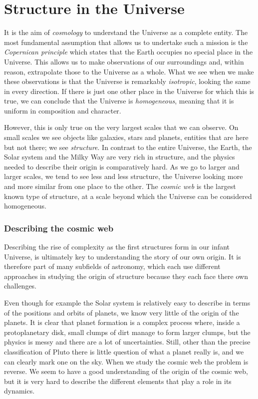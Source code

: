 \clearpage
\section{Structure in the Universe}
It is the aim of \emph{cosmology} to understand the Universe as a complete entity.  The most fundamental assumption that allows us to undertake such a mission is the \emph{Copernican principle} which states that the Earth occupies no special place in the Universe. This allows us to make observations of our surroundings and, within reason, extrapolate those to the Universe as a whole.
What we see when we make these observations is that the Universe is remarkably \emph{isotropic}, looking the same in every direction. If there is just one other place in the Universe for which this is true, we can conclude that the Universe is \emph{homogeneous}, meaning that it is uniform in composition and character.

However, this is only true on the very largest scales that we can observe. On small scales we see objects like galaxies, stars and planets, entities that are here but not there; we see \emph{structure}. In contrast to the entire Universe, the Earth, the Solar system and the Milky Way are very rich in structure, and the physics needed to describe their origin is comparatively hard. As we go to larger and larger scales, we tend to see less and less structure, the Universe looking more and more similar from one place to the other.  The \emph{cosmic web} is the largest known type of structure, at a scale beyond which the Universe can be considered homogeneous.

\subsubsection{Describing the cosmic web}
Describing the rise of complexity as the first structures form in our infant Universe, is ultimately key to understanding the story of our own origin. It is therefore part of many subfields of astronomy, which each use different approaches in studying the origin of structure because they each face there own challenges.

Even though for example the Solar system is relatively easy to describe in terms of the positions and orbits of planets, we know very little of the origin of the planets. It is clear that planet formation is a complex process where, inside a protoplanetary disk, small clumps of dirt manage to form larger clumps, but the physics is messy and there are a lot of uncertainties. Still, other than the precise classification of Pluto there is little question of what a planet really is, and we can clearly mark one on the sky.  When we study the cosmic web the problem is reverse. We seem to have a good understanding of the origin of the cosmic web, but it is very hard to describe the different elements that play a role in its dynamics.

